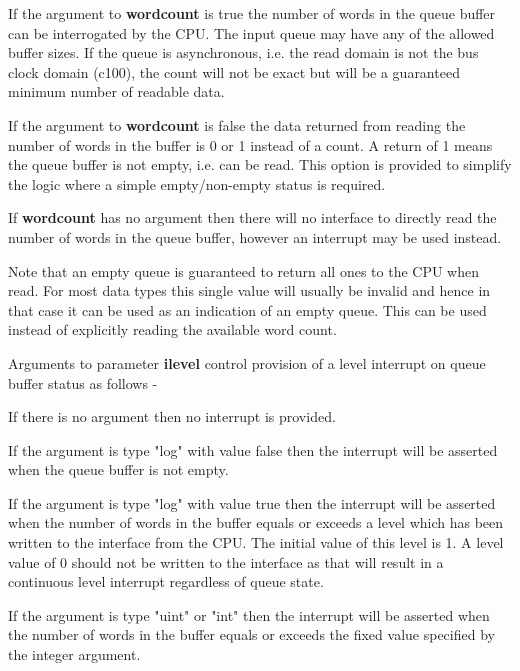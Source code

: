             If the argument to {\bf wordcount} is true the number of words in the
            queue buffer can be interrogated by the CPU. The input queue may have
            any of the allowed buffer sizes. If the queue is asynchronous, i.e. the
            read domain is not the bus clock domain (c100), the count will not be
            exact but will be a guaranteed minimum number of readable data.

            If the argument to {\bf wordcount} is false the data returned from
            reading the number of words in the buffer is 0 or 1 instead of a count.
            A return of 1 means the queue buffer is not empty, i.e. can be read.
            This option is provided to simplify the logic where a simple
            empty/non-empty status is required.

            If {\bf wordcount} has no argument then there will no interface to
            directly read the number of words in the queue buffer, however an
            interrupt may be used instead.            

            Note that an empty queue is guaranteed to return all ones to the CPU
            when read. For most data types this single value will usually be invalid
            and hence in that case it can be used as an indication of an empty
            queue. This can be used instead of explicitly reading the available word
            count.

            Arguments to parameter {\bf ilevel} control provision of a level
            interrupt on queue buffer status as follows -

            If there is no argument then no interrupt is provided.

            If the argument is type "log" with value false then the interrupt will
            be asserted when the queue buffer is not empty.

            If the argument is type "log" with value true then the interrupt will be
            asserted when the number of words in the buffer equals or exceeds a
            level which has been written to the interface from the CPU. The initial
            value of this level is 1. A level value of 0 should not be written to
            the interface as that will result in a continuous level interrupt
            regardless of queue state.

            If the argument is type "uint" or "int" then the interrupt will be
            asserted when the number of words in the buffer equals or exceeds the
            fixed value specified by the integer argument.

